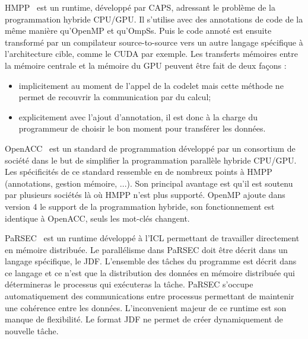 HMPP~\cite{hmpp} est un runtime, développé par CAPS, adressant le problème de la programmation hybride CPU/GPU.
%
Il s'utilise avec des annotations de code de la même manière qu'OpenMP et qu'OmpSs.
%
Puis le code annoté est ensuite transformé par un compilateur source-to-source vers un autre langage spécifique à l'architecture cible, comme le CUDA par exemple.
%
Les transferts mémoires entre la mémoire centrale et la mémoire du GPU peuvent être fait de deux façons :
\begin{itemize}
  \item implicitement au moment de l'appel de la codelet mais cette méthode ne permet de recouvrir la communication par du calcul;
  \item explicitement avec l'ajout d'annotation, il est donc à la charge du programmeur de choisir le bon moment pour transférer les données.
\end{itemize}
%



OpenACC~\cite{OpenACC} est un standard de programmation développé par un consortium de société dans le but de simplifier la programmation parallèle hybride CPU/GPU.
%
Les spécificités de ce standard ressemble en de nombreux points à HMPP (annotations, gestion mémoire, ...).
%
Son principal avantage est qu'il est soutenu par plusieurs sociétés là où HMPP n'est plus supporté.
%
OpenMP ajoute dans version 4 le support de la programmation hybride, son fonctionnement est identique à OpenACC, seuls les mot-clés changent.


PaRSEC~\cite{PaRSEC} est un runtime développé à l'ICL permettant de travailler directement en mémoire distribuée.
%
Le parallélisme dans PaRSEC doit être décrit dans un langage spécifique, le JDF.
%
L'ensemble des tâches du programme est décrit dans ce langage et ce n'est que la distribution des données en mémoire distribuée qui détermineras le processus qui exécuteras la tâche.
%
PaRSEC s'occupe automatiquement des communications entre processus permettant de maintenir une cohérence entre les données.
%
L'inconvenient majeur de ce runtime est son manque de flexibilité.
%
Le format JDF ne permet de créer dynamiquement de nouvelle tâche.
